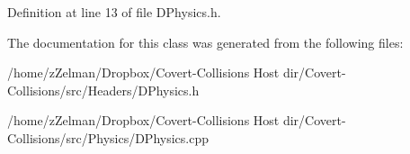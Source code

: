 Definition at line 13 of file D\-Physics.\-h.



The documentation for this class was generated from the following files\-:\begin{DoxyCompactItemize}
\item 
/home/z\-Zelman/\-Dropbox/\-Covert-\/\-Collisions Host dir/\-Covert-\/\-Collisions/src/\-Headers/D\-Physics.\-h\item 
/home/z\-Zelman/\-Dropbox/\-Covert-\/\-Collisions Host dir/\-Covert-\/\-Collisions/src/\-Physics/D\-Physics.\-cpp\end{DoxyCompactItemize}
